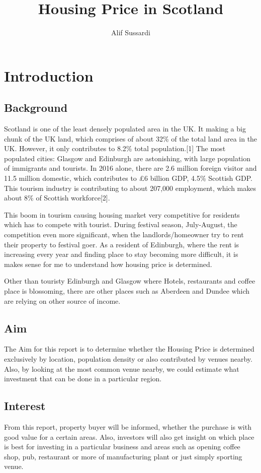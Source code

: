 \documentclass{homeworg}
\title{Housing Price in Scotland}
\author{Alif Sussardi}
\begin{document}
\graphicspath{ {./figure/} }
\maketitle

\section{Introduction}
\subsection{Background}
Scotland is one of the least densely populated area in the UK. It making a big chunk of the UK land, which comprises of about 32\% of the total land area in the UK. However, it only contributes to 8.2\% total population.[1] The most populated cities: Glasgow and Edinburgh are astonishing, with large population of immigrants and tourists. In 2016 alone, there are 2.6 million foreign visitor and 11.5 million domestic, which contributes to £6 billion GDP, 4.5\% Scottish GDP. This tourism industry is contributing to about 207,000 employment, which makes about 8\% of Scottish workforce[2]. \par
This boom in tourism causing housing market very competitive for residents which has to compete with tourist. During festival season, July-August, the competition even more significant, when the landlords/homeowner try to rent their property to festival goer. As a resident of Edinburgh, where the rent is increasing every year and finding place to stay becoming more difficult, it is makes sense for me to understand how housing price is determined. \par
Other than touristy Edinburgh and Glasgow where Hotels, restaurants and coffee place is blossoming, there are other places such as Aberdeen and Dundee which are relying on other source of income. 

\subsection{Aim}
The Aim for this report is to determine whether the Housing Price is determined exclusively by location, population density or also contributed by venues nearby. Also, by looking at the most common venue nearby, we could estimate what investment that can be done in a particular region.

\subsection{Interest}
From this report, property buyer will be informed, whether the purchase is with good value for a certain areas. Also, investors will also get insight on which place is best for investing in a particular business and areas such as opening coffee shop, pub, restaurant or more of manufacturing plant or just simply sporting venue.
\end{document}
